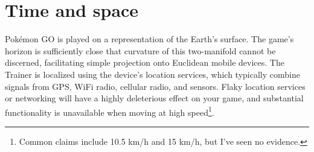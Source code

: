 \chapter{Time and space\label{chap:timespace}}
Pokémon GO is played on a representation of the Earth's surface.
The game's horizon is sufficiently close that curvature of this two-manifold
 cannot be discerned, facilitating simple projection onto Euclidean mobile devices.
The Trainer is localized using the device's location services, which typically
 combine signals from GPS, WiFi radio, cellular radio, and sensors.
Flaky location services or networking will have a highly deleterious effect on your game,
 and substantial functionality is unavailable when moving at high speed\footnote{Common
 claims include 10.5 km/h and 15 km/h, but I've seen no evidence.}.

